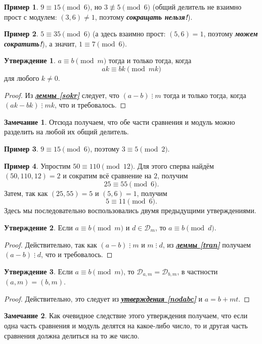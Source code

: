 \documentclass[14pt, a4paper]{extarticle}
\theoremstyle{definition}
\newtheorem*{remark}{Замечание}
\newtheorem{example}{Пример}
\newtheorem{statement}{Утверждение}
\newcommand{\divisible}{\mathop{\vdots}}
\begin{document}
	\begin{example}
		$9\equiv15\pmod{6}$, но $3\not\equiv5\pmod{6}$ (общий делитель не взаимно прост с модулем: $(3,6)\neq1$, поэтому \textbf{\textit{сокращать нельзя!}}).
	\end{example}
	\begin{example}
		$5\equiv35\pmod{6}$ (а здесь взаимно прост: $(5,6)=1$, поэтому \textbf{\textit{можем сократить!}}), а значит, $1\equiv7\pmod{6}$.
	\end{example}

	\begin{statement}
	\label{sokrmod2}
		$a\equiv b\pmod{m}$ тогда и только тогда, когда $$ak\equiv bk\pmod{mk}$$ для любого $k\neq0$.
	\end{statement}
	\begin{proof}
		Из \hyperref[sokr]{\textbf{\textit{леммы \ref*{sokr}}}} следует, что $(a-b)\divisible m$ тогда и только тогда, когда $(ak-bk)\divisible mk$, что и требовалось.
	\end{proof}

	\begin{remark}
		Отсюда получаем, что обе части сравнения и модуль можно разделить на любой их общий делитель.
	\end{remark}
	
	\begin{example}
		$9\equiv15\pmod{6}$, поэтому $3\equiv5\pmod{2}$.
	\end{example}

	\begin{example}
		Упростим $50\equiv110\pmod{12}$. Для этого сперва найдём $(50,110,12)=2$ и сократим всё сравнение на $2$, получим $$25\equiv55\pmod{6}.$$ Затем, так как $(25,55)=5$ и $(5,6)=1$, получим $$5\equiv11\pmod{6}.$$ Здесь мы последовательно воспользовались двумя предыдущими утверждениями.
	\end{example}

	\begin{statement}
		Если $a\equiv b\pmod{m}$ и $d\in\mathcal{D}_m$, то $a\equiv b\pmod{d}$.
	\end{statement}
	\begin{proof}
		Действительно, так как $(a-b)\divisible m$ и $m\divisible d$, из \hyperref[tran]{\textbf{\textit{леммы \ref*{tran}}}} получаем $(a-b)\divisible d$, что и требовалось.
	\end{proof}

	\begin{statement}
	\label{nodsr}
		Если $a\equiv b\pmod{m}$, то $\mathcal{D}_{a,m}=\mathcal{D}_{b,m}$, в частности $(a,m)=(b,m)$.
	\end{statement}
	\begin{proof}
		Действительно, это следует из \hyperref[nodabc]{\textbf{\textit{утверждения \ref*{nodabc}}}} и $a=b+mt$.
	\end{proof}
	\begin{remark}
		Как очевидное следствие этого утверждения получаем, что если одна часть сравнения и модуль делятся на какое-либо число, то и другая часть сравнения должна делиться на то же число.
	\end{remark}
\end{document}
